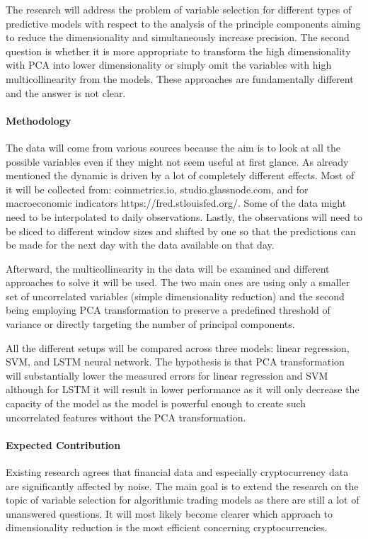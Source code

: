 The research will address the problem of variable selection for different types of predictive models with respect to the
analysis of the principle components aiming to reduce the dimensionality and simultaneously increase precision. The second
question is whether it is more appropriate to transform the high dimensionality with PCA into lower dimensionality or
simply omit the variables with high multicollinearity from the models. These approaches are fundamentally different and the
answer is not clear.

\paragraph{Methodology}

The data will come from various sources because the aim is to look at all the possible variables even if they might not seem
useful at first glance. As already mentioned the dynamic is driven by a lot of completely different effects. Most of it will be
collected from: coinmetrics.io, studio.glassnode.com, and for macroeconomic indicators https://fred.stlouisfed.org/. Some of
the data might need to be interpolated to daily observations. Lastly, the observations will need to be sliced to different
window sizes and shifted by one so that the predictions can be made for the next day with the data available on that day.

Afterward, the multicollinearity in the data will be examined and different approaches to solve it will be used. The two main
ones are using only a smaller set of uncorrelated variables (simple dimensionality reduction) and the second being employing
PCA transformation to preserve a predefined threshold of variance or directly targeting the number of principal components.

All the different setups will be compared across three models: linear regression, SVM, and LSTM neural network. The
hypothesis is that PCA transformation will substantially lower the measured errors for linear regression and SVM although
for LSTM it will result in lower performance as it will only decrease the capacity of the model as the model is powerful
enough to create such uncorrelated features without the PCA transformation.

\paragraph{Expected Contribution}

Existing research agrees that financial data and especially cryptocurrency data are significantly affected by noise. The main
goal is to extend the research on the topic of variable selection for algorithmic trading models as there are still a lot of
unanswered questions. It will most likely become clearer which approach to dimensionality reduction is the most efficient
concerning cryptocurrencies.

